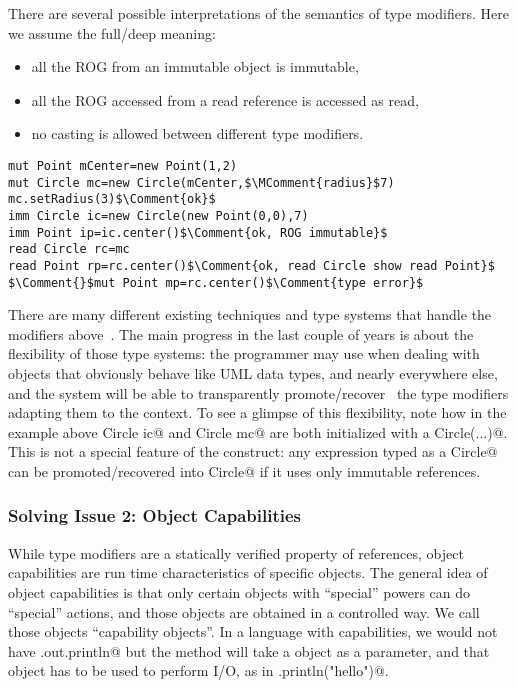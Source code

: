 There are several possible interpretations of the semantics of type modifiers.
Here we assume the full/deep meaning:
\begin{itemize}
\item all the ROG from an immutable object is immutable,
\item all the ROG accessed from a read reference is accessed as read,
\item no casting is allowed between different type modifiers.
\end{itemize}
\saveSpace
\begin{lstlisting}
mut Point mCenter=new Point(1,2)
mut Circle mc=new Circle(mCenter,$\MComment{radius}$7)
mc.setRadius(3)$\Comment{ok}$
imm Circle ic=new Circle(new Point(0,0),7)
imm Point ip=ic.center()$\Comment{ok, ROG immutable}$
read Circle rc=mc
read Point rp=rc.center()$\Comment{ok, read Circle show read Point}$
$\Comment{}$mut Point mp=rc.center()$\Comment{type error}$ 
\end{lstlisting}
\saveSpace

There are many different existing techniques and type systems that handle the modifiers above~\cite{ZibinEtAl10,ClarkeWrigstad03,HallerOdersky10,GordonEtAl12,ServettoZucca15}.
The main progress in the last couple of years is about the flexibility of those type systems: the programmer may use \Q@imm@ when dealing with objects that obviously behave like
 UML data types, and \Q@mut@ nearly everywhere else,
 and the system will be able to transparently promote/recover~\cite{GordonEtAl12,clebsch2015deny,ServettoZucca15}
 the type modifiers adapting them to the context.
To see a glimpse of this flexibility, note how in the example above \Q@imm Circle ic@ and
\Q@mut Circle mc@ are both initialized with a \Q@new Circle(...)@.
This is not a special feature of the \Q@new@ construct: any expression typed as a \Q@mut Circle@ can be promoted/recovered into \Q@imm Circle@ if it uses only immutable references.

\saveSpace
\subsubsection*{Solving Issue 2: Object Capabilities}
\saveSpace
While type modifiers are a statically verified property of references, object capabilities are run time characteristics of specific objects.
The general idea of object capabilities is that only certain objects with ``special'' powers can do ``special'' actions, and those objects are obtained in a controlled way.
We call those objects ``capability objects''.
In a language with capabilities, we would not have \Q@System.out.println@ but the \Q@main@ method will take a \Q@System@ object as a parameter, and that object has to be used to perform I/O, as in \Q@mySystem.println("hello")@.

